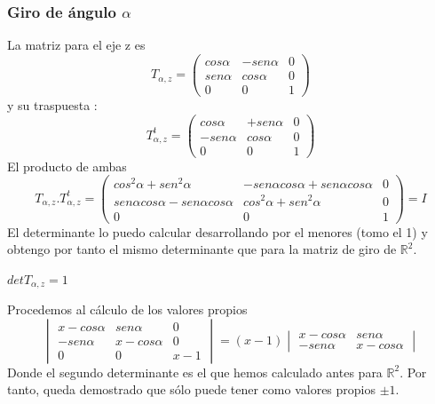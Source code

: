 \documentclass [a4paper,12pt]{article}
\begin{document}
\subsubsection{Giro de ángulo $\alpha$}
La matriz para el eje z es
$$
T_{\alpha, z}=\begin{pmatrix}
cos \alpha&- sen \alpha &0\\
sen \alpha&cos \alpha&0\\
0&0&1
\end{pmatrix}
$$
y su traspuesta :
$$
T^t_{\alpha, z}=\begin{pmatrix}
cos \alpha&+sen \alpha &0\\
-sen \alpha&cos \alpha&0\\
0&0&1
\end{pmatrix}
$$
El producto de ambas 
$$
T_{\alpha, z} .T^t_{\alpha, z}=\begin{pmatrix}
cos^2\alpha+sen^2\alpha&-sen\alpha cos\alpha + sen\alpha cos\alpha &0\\
sen\alpha cos\alpha-sen\alpha cos\alpha&cos^2\alpha+sen^2\alpha&0\\
0&0&1
\end{pmatrix}= I
$$
El determinante lo puedo calcular desarrollando por el menores (tomo el 1) y obtengo por tanto el mismo determinante que para la matriz de giro de $\mathbb{R}^2$.\par
$ det T_{\alpha, z} = 1$ \par
Procedemos al cálculo de los valores propios
$$
\begin{vmatrix}
x-cos\alpha&sen\alpha&0\\
-sen\alpha&x-cos\alpha&0\\
0&0&x-1
\end{vmatrix}=(x-1)\begin{vmatrix}
x-cos\alpha&sen\alpha\\
-sen\alpha&x-cos\alpha
\end{vmatrix}
$$
Donde el segundo determinante es el que hemos calculado antes para $\mathbb{R}^2$. Por tanto, queda demostrado que sólo puede tener como valores propios $\pm1$.
\end{document}
